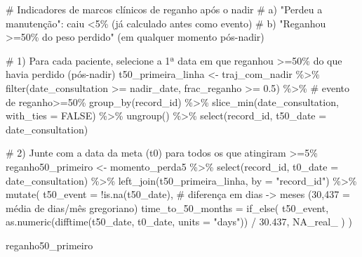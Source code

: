 \documentclass[
]{article}
\newenvironment{Shaded}{\begin{snugshade}}{\end{snugshade}}
\newcommand{\AttributeTok}[1]{\textcolor[rgb]{0.40,0.45,0.13}{#1}}
\newcommand{\CommentTok}[1]{\textcolor[rgb]{0.37,0.37,0.37}{#1}}
\newcommand{\ConstantTok}[1]{\textcolor[rgb]{0.56,0.35,0.01}{#1}}
\newcommand{\FloatTok}[1]{\textcolor[rgb]{0.68,0.00,0.00}{#1}}
\newcommand{\FunctionTok}[1]{\textcolor[rgb]{0.28,0.35,0.67}{#1}}
\newcommand{\NormalTok}[1]{\textcolor[rgb]{0.00,0.23,0.31}{#1}}
\newcommand{\OtherTok}[1]{\textcolor[rgb]{0.00,0.23,0.31}{#1}}
\newcommand{\SpecialCharTok}[1]{\textcolor[rgb]{0.37,0.37,0.37}{#1}}
\newcommand{\StringTok}[1]{\textcolor[rgb]{0.13,0.47,0.30}{#1}}
\begin{document}
\begin{Shaded}
\begin{Highlighting}[]
\CommentTok{\# Indicadores de marcos clínicos de reganho após o nadir}
\CommentTok{\#  a) "Perdeu a manutenção": caiu \textless{}5\% (já calculado antes como evento)}
\CommentTok{\#  b) "Reganhou \textgreater{}=50\% do peso perdido" (em qualquer momento pós{-}nadir)}

\CommentTok{\# 1) Para cada paciente, selecione a 1ª data em que reganhou \textgreater{}=50\% do que havia perdido (pós{-}nadir)}
\NormalTok{t50\_primeira\_linha }\OtherTok{\textless{}{-}}\NormalTok{ traj\_com\_nadir }\SpecialCharTok{\%\textgreater{}\%}
  \FunctionTok{filter}\NormalTok{(date\_consultation }\SpecialCharTok{\textgreater{}=}\NormalTok{ nadir\_date, frac\_reganho }\SpecialCharTok{\textgreater{}=} \FloatTok{0.5}\NormalTok{) }\SpecialCharTok{\%\textgreater{}\%}     \CommentTok{\# evento de reganho\textgreater{}=50\%}
  \FunctionTok{group\_by}\NormalTok{(record\_id) }\SpecialCharTok{\%\textgreater{}\%}
  \FunctionTok{slice\_min}\NormalTok{(date\_consultation, }\AttributeTok{with\_ties =} \ConstantTok{FALSE}\NormalTok{) }\SpecialCharTok{\%\textgreater{}\%}
  \FunctionTok{ungroup}\NormalTok{() }\SpecialCharTok{\%\textgreater{}\%}
  \FunctionTok{select}\NormalTok{(record\_id, }\AttributeTok{t50\_date =}\NormalTok{ date\_consultation)}

\CommentTok{\# 2) Junte com a data da meta (t0) para todos os que atingiram \textgreater{}=5\%}
\NormalTok{reganho50\_primeiro }\OtherTok{\textless{}{-}}\NormalTok{ momento\_perda5 }\SpecialCharTok{\%\textgreater{}\%}
  \FunctionTok{select}\NormalTok{(record\_id, }\AttributeTok{t0\_date =}\NormalTok{ date\_consultation) }\SpecialCharTok{\%\textgreater{}\%}
  \FunctionTok{left\_join}\NormalTok{(t50\_primeira\_linha, }\AttributeTok{by =} \StringTok{"record\_id"}\NormalTok{) }\SpecialCharTok{\%\textgreater{}\%}
  \FunctionTok{mutate}\NormalTok{(}
    \AttributeTok{t50\_event =} \SpecialCharTok{!}\FunctionTok{is.na}\NormalTok{(t50\_date),}
    \CommentTok{\# diferença em dias {-}\textgreater{} meses (30,437 = média de dias/mês gregoriano)}
    \AttributeTok{time\_to\_50\_months =} \FunctionTok{if\_else}\NormalTok{(}
\NormalTok{      t50\_event,}
      \FunctionTok{as.numeric}\NormalTok{(}\FunctionTok{difftime}\NormalTok{(t50\_date, t0\_date, }\AttributeTok{units =} \StringTok{"days"}\NormalTok{)) }\SpecialCharTok{/} \FloatTok{30.437}\NormalTok{,}
      \ConstantTok{NA\_real\_}
\NormalTok{    )}
\NormalTok{  )}

\NormalTok{reganho50\_primeiro}
\end{Highlighting}
\end{Shaded}
\end{document}
